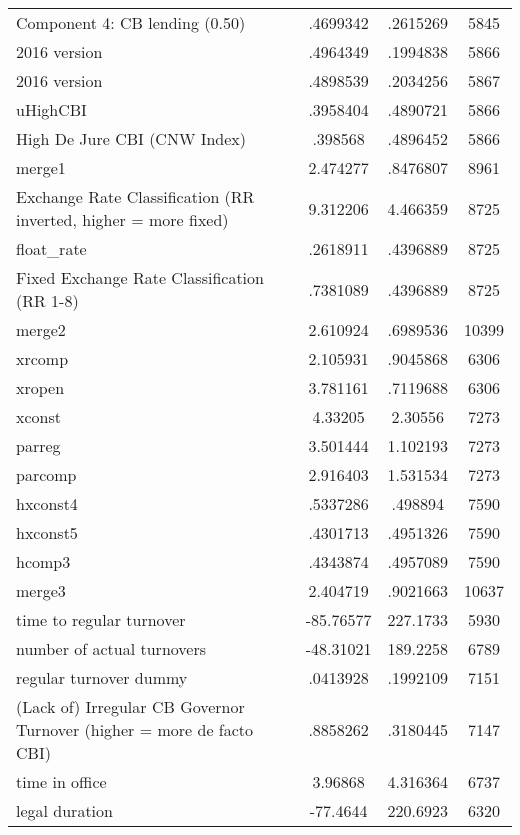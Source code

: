 {\begin{tabular}{l*{1}{ccc}}
Component 4: CB lending (0.50)&    .4699342&    .2615269&        5845\\
2016 version        &    .4964349&    .1994838&        5866\\
2016 version        &    .4898539&    .2034256&        5867\\
uHighCBI            &    .3958404&    .4890721&        5866\\
High De Jure CBI (CNW Index)&     .398568&    .4896452&        5866\\
merge1              &    2.474277&    .8476807&        8961\\
Exchange Rate Classification (RR inverted, higher = more fixed)&    9.312206&    4.466359&        8725\\
float\_rate          &    .2618911&    .4396889&        8725\\
Fixed Exchange Rate Classification (RR 1-8)&    .7381089&    .4396889&        8725\\
merge2              &    2.610924&    .6989536&       10399\\
xrcomp              &    2.105931&    .9045868&        6306\\
xropen              &    3.781161&    .7119688&        6306\\
xconst              &     4.33205&     2.30556&        7273\\
parreg              &    3.501444&    1.102193&        7273\\
parcomp             &    2.916403&    1.531534&        7273\\
hxconst4            &    .5337286&     .498894&        7590\\
hxconst5            &    .4301713&    .4951326&        7590\\
hcomp3              &    .4343874&    .4957089&        7590\\
merge3              &    2.404719&    .9021663&       10637\\
time to regular turnover&   -85.76577&    227.1733&        5930\\
number of actual turnovers&   -48.31021&    189.2258&        6789\\
regular turnover dummy&    .0413928&    .1992109&        7151\\
(Lack of) Irregular CB Governor Turnover (higher = more de facto CBI)&    .8858262&    .3180445&        7147\\
time in office      &     3.96868&    4.316364&        6737\\
legal duration      &    -77.4644&    220.6923&        6320\\

\end{tabular}}
